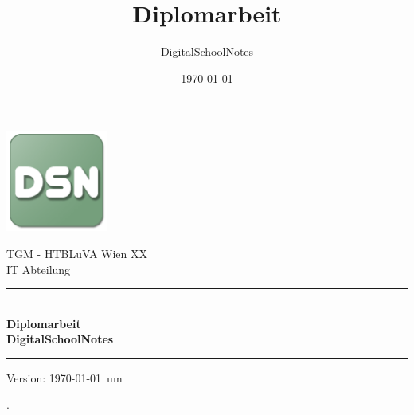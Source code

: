 \documentclass[12pt]{article}
\title{Diplomarbeit}
\author{DigitalSchoolNotes}
\date{\today}
\begin{document}
\begin{titlepage}
\begin{center}

\includegraphics[width=0.25\textwidth]{images/dsn_logo}\\
\vspace{5mm}

\LARGE TGM - HTBLuVA Wien XX \\ IT Abteilung  \\[1.5cm]

\rule{1.0\textwidth}{1mm}
{ \huge \bfseries \\[0.4cm]  \huge Diplomarbeit \\ \LARGE DigitalSchoolNotes \\[0.4cm] }

\rule{1.0\textwidth}{1mm}



\noindent 


\vfill

{\small Version: \today ~um  \thistime    }
\end{center}

\end{titlepage}


\ohead{\headmark}
\ofoot{\pagemark}

\newpage %
{\small\color{white}.}
\vspace{-0.7cm}
\renewcommand*\contentsname{Inhalt}
\tableofcontents

\newpage %

\newpage


\newpage

\label{pageRomanEnd}

\newpage %
\end{document}
